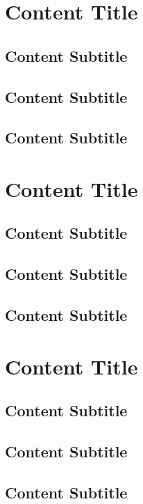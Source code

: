 \section{Content Title}
\subsection{Content Subtitle}
\subsection{Content Subtitle}
\subsection{Content Subtitle}

\newpage

\section{Content Title}
\subsection{Content Subtitle}
\subsection{Content Subtitle}
\subsection{Content Subtitle}

\newpage

\section{Content Title}
\subsection{Content Subtitle}
\subsection{Content Subtitle}
\subsection{Content Subtitle}
